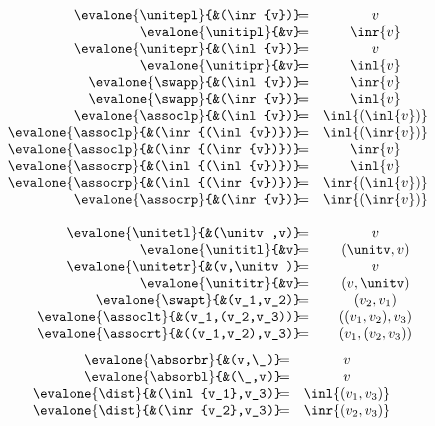 \begin{figure*}[ht]
\begin{multicols}{2}
\[\begin{array}{r@{\!}lcl}
\evalone{\unitepl}{&(\inr{v})} &=& v \\
\evalone{\unitipl}{&v} &=& \inr{v} \\
\evalone{\unitepr}{&(\inl{v})} &=& v \\
\evalone{\unitipr}{&v} &=& \inl{v} \\
\evalone{\swapp}{&(\inl{v})} &=& \inr{v} \\
\evalone{\swapp}{&(\inr{v})} &=& \inl{v} \\
\evalone{\assoclp}{&(\inl{v})} &=& \inl{(\inl{v})} \\
\evalone{\assoclp}{&(\inr{(\inl{v})})} &=& \inl{(\inr{v})} \\
\evalone{\assoclp}{&(\inr{(\inr{v})})} &=& \inr{v} \\
\evalone{\assocrp}{&(\inl{(\inl{v})})} &=& \inl{v} \\
\evalone{\assocrp}{&(\inl{(\inr{v})})} &=& \inr{(\inl{v})} \\
\evalone{\assocrp}{&(\inr{v})} &=& \inr{(\inr{v})} \\
\\
\evalone{\unitetl}{&(\unitv,v)} &=& v \\
\evalone{\unititl}{&v} &=& (\unitv,v) \\
\evalone{\unitetr}{&(v,\unitv)} &=& v \\
\evalone{\unititr}{&v} &=& (v,\unitv) \\
\evalone{\swapt}{&(v_1,v_2)} &=& (v_2,v_1) \\
\evalone{\assoclt}{&(v_1,(v_2,v_3))} &=& ((v_1,v_2),v_3) \\
\evalone{\assocrt}{&((v_1,v_2),v_3)} &=& (v_1,(v_2,v_3)) \\
\end{array}\]
\[\begin{array}{r@{\!}lcl}
\evalone{\absorbr}{&(v,\_)} &=& v \\
\evalone{\absorbl}{&(\_,v)} &=& v \\
\evalone{\dist}{&(\inl{v_1},v_3)} &=& \inl{(v_1,v_3)} \\
\evalone{\dist}{&(\inr{v_2},v_3)} &=& \inr{(v_2,v_3)} \\

\end{array}\]
\end{multicols}
\end{figure*}
